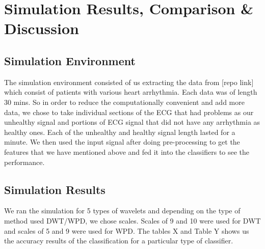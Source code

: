 \documentclass[10pt,twocolumn,letterpaper]{article}
\begin{document}
\section{Simulation Results, Comparison \& Discussion}
\subsection{Simulation Environment}
The simulation environment consisted of us extracting the data from [repo link] which consist of patients with various heart arrhythmia. Each data was of length 30 mins. So in order to reduce the computationally convenient and add more data, we chose to take individual sections of the ECG that had problems as our unhealthy signal and portions of ECG signal that did not have any arrhythmia as healthy ones. Each of the unhealthy and healthy signal length lasted for a minute. We then used the input signal after doing pre-processing to get the features that we have mentioned above and fed it into the classifiers to see the performance.

\subsection{Simulation Results} 
We ran the simulation for 5 types of wavelets and depending on the type of method used DWT/WPD, we chose scales. Scales of 9 and 10 were used for DWT and scales of 5 and 9 were used for WPD. The tables X and Table Y shows us the accuracy results of the classification for a particular type of classifier. 
\end{document}
